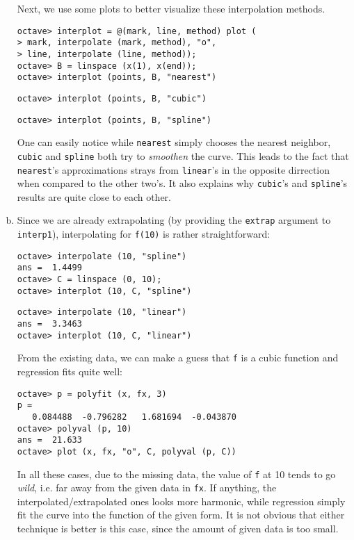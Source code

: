 \documentclass[a4paper,12pt]{article}
\begin{document}
\begin{enumerate}[(a)]
    Next, we use some plots to better visualize these interpolation methods.
\begin{verbatim}
octave> interplot = @(mark, line, method) plot (
> mark, interpolate (mark, method), "o",
> line, interpolate (line, method));
octave> B = linspace (x(1), x(end));
octave> interplot (points, B, "nearest")
\end{verbatim}
\scalebox{0.61}{}
\begin{verbatim}
octave> interplot (points, B, "cubic")
\end{verbatim}
\scalebox{0.61}{}
\begin{verbatim}
octave> interplot (points, B, "spline")
\end{verbatim}
\scalebox{0.61}{}

    One can easily notice while \verb|nearest| simply chooses the nearest
    neighbor, \verb|cubic| and \verb|spline| both try to \textit{smoothen}
    the curve.  This leads to the fact that \verb|nearest|'s approximations
    strays from \verb|linear|'s in the opposite dirrection when compared to
    the other two's.  It also explains why \verb|cubic|'s and \verb|spline|'s
    results are quite close to each other.

  \item Since we are already extrapolating (by providing the \verb|extrap|
    argument to \verb|interp1|), interpolating for \verb|f(10)| is rather
    straightforward:
\begin{verbatim}
octave> interpolate (10, "spline")
ans =  1.4499
octave> C = linspace (0, 10);
octave> interplot (10, C, "spline")
\end{verbatim}
\scalebox{0.39}{}
\begin{verbatim}
octave> interpolate (10, "linear")
ans =  3.3463
octave> interplot (10, C, "linear")
\end{verbatim}
\scalebox{0.39}{}

    From the existing data, we can make a guess that \verb|f|
    is a cubic function and regression fits quite well:
\begin{verbatim}
octave> p = polyfit (x, fx, 3)
p =
   0.084488  -0.796282   1.681694  -0.043870
octave> polyval (p, 10)
ans =  21.633
octave> plot (x, fx, "o", C, polyval (p, C))
\end{verbatim}
\scalebox{0.62}{}

    In all these cases, due to the missing data, the value of \verb|f| at 10
    tends to go \textit{wild}, i.e. far away from the given data in \verb|fx|.
    If anything, the interpolated/extrapolated ones looks more harmonic,
    while regression simply fit the curve into the function of the given form.
    It is not obvious that either technique is better is this case,
    since the amount of given data is too small.
\end{enumerate}
\end{document}

